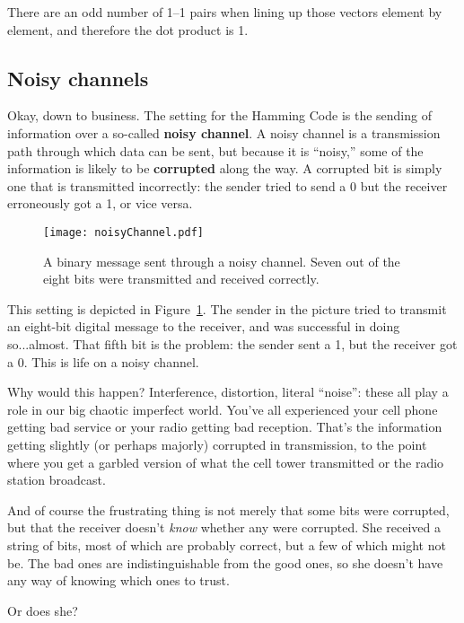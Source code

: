There are an odd number of 1--1 pairs when lining up those vectors element by
element, and therefore the dot product is 1.

\subsection{Noisy channels}


Okay, down to business. The setting for the Hamming Code is the sending of
information over a so-called \textbf{noisy channel}. A noisy channel is a
transmission path through which data can be sent, but because it is ``noisy,''
some of the information is likely to be \textbf{corrupted} along the way. A
corrupted bit is simply one that is transmitted incorrectly: the sender tried
to send a 0 but the receiver erroneously got a 1, or vice versa.

\begin{figure}[ht]
\centering
\texttt{[image: noisyChannel.pdf]}
\caption{A binary message sent through a noisy channel. Seven out of the eight
bits were transmitted and received correctly.}
\label{fig:noisyChannel}
\end{figure}

This setting is depicted in Figure~\ref{fig:noisyChannel}. The sender in the
picture tried to transmit an eight-bit digital message to the receiver, and was
successful in doing so...almost. That fifth bit is the problem: the sender sent
a 1, but the receiver got a 0. This is life on a noisy channel.

Why would this happen? Interference, distortion, literal ``noise'': these all
play a role in our big chaotic imperfect world. You've all experienced your
cell phone getting bad service or your radio getting bad reception. That's the
information getting slightly (or perhaps majorly) corrupted in transmission, to
the point where you get a garbled version of what the cell tower transmitted or
the radio station broadcast.

And of course the frustrating thing is not merely that some bits were
corrupted, but that the receiver doesn't \textit{know} whether any were
corrupted. She received a string of bits, most of which are probably correct,
but a few of which might not be. The bad ones are indistinguishable from the
good ones, so she doesn't have any way of knowing which ones to trust.

Or does she?

